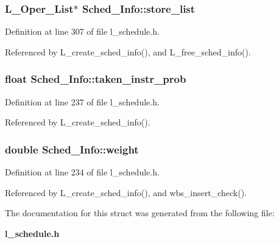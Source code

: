 \subsubsection{\setlength{\rightskip}{0pt plus 5cm}L\_\-Oper\_\-List$\ast$ \bf{Sched\_\-Info::store\_\-list}}\label{structSched__Info_da5936895a62f32f5355614cb74aecb3}




Definition at line 307 of file l\_\-schedule.h.

Referenced by L\_\-create\_\-sched\_\-info(), and L\_\-free\_\-sched\_\-info().
\subsubsection{\setlength{\rightskip}{0pt plus 5cm}float \bf{Sched\_\-Info::taken\_\-instr\_\-prob}}\label{structSched__Info_a8a4e140b3f9d8b9c7626d4bf9c8a3fd}




Definition at line 237 of file l\_\-schedule.h.

Referenced by L\_\-create\_\-sched\_\-info().
\subsubsection{\setlength{\rightskip}{0pt plus 5cm}double \bf{Sched\_\-Info::weight}}\label{structSched__Info_381644649cf0aaa68331b1da73950152}




Definition at line 234 of file l\_\-schedule.h.

Referenced by L\_\-create\_\-sched\_\-info(), and wbs\_\-insert\_\-check().

The documentation for this struct was generated from the following file:\begin{CompactItemize}
\item 
\bf{l\_\-schedule.h}\end{CompactItemize}
